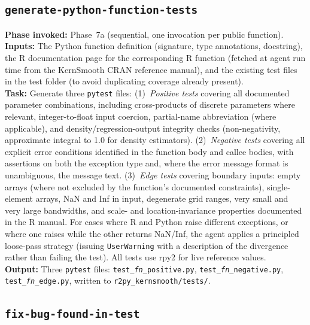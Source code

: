 \documentclass[12pt,a4paper]{article}
\begin{document}
\subsection{\texttt{generate-python-function-tests}}
\label{supp:agent-gen-tests}

\textbf{Phase invoked:} Phase~7a (sequential, one invocation per public function).\\
\textbf{Inputs:} The Python function definition (signature, type annotations, docstring), the R documentation page for the corresponding R function (fetched at agent run time from the KernSmooth CRAN reference manual), and the existing test files in the test folder (to avoid duplicating coverage already present).\\
\textbf{Task:} Generate three \texttt{pytest} files: (1)~\textit{Positive tests} covering all documented parameter combinations, including cross-products of discrete parameters where relevant, integer-to-float input coercion, partial-name abbreviation (where applicable), and density/regression-output integrity checks (non-negativity, approximate integral to 1.0 for density estimators). (2)~\textit{Negative tests} covering all explicit error conditions identified in the function body and callee bodies, with assertions on both the exception type and, where the error message format is unambiguous, the message text. (3)~\textit{Edge tests} covering boundary inputs: empty arrays (where not excluded by the function's documented constraints), single-element arrays, NaN and Inf in input, degenerate grid ranges, very small and very large bandwidths, and scale- and location-invariance properties documented in the R manual. For cases where R and Python raise different exceptions, or where one raises while the other returns NaN/Inf, the agent applies a principled loose-pass strategy (issuing \texttt{UserWarning} with a description of the divergence rather than failing the test). All tests use rpy2 for live reference values.\\
\textbf{Output:} Three \texttt{pytest} files: \texttt{test\_\textit{fn}\_positive.py}, \texttt{test\_\textit{fn}\_negative.py}, \texttt{test\_\textit{fn}\_edge.py}, written to \texttt{r2py\_kernsmooth/tests/}.

\subsection{\texttt{fix-bug-found-in-test}}
\label{supp:agent-fix-bug}
\end{document}
